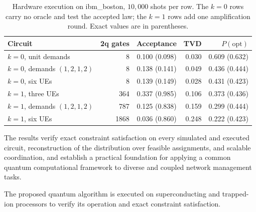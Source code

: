 \begin{table}[!t]
\centering
\caption{Hardware execution on ibm\_boston, $10{,}000$ shots per row. The
$k=0$ rows carry no oracle and test the accepted law; the $k=1$ rows add one
amplification round. Exact values are in parentheses.}
\label{tab:eval_hardware}
\footnotesize
\setlength{\tabcolsep}{3pt}
\begin{tabular}{lrrrr}
\toprule
Circuit & 2q gates & Acceptance & TVD & $P(\text{opt})$ \\
\midrule
$k=0$, unit demands        &    8 & 0.100 (0.098) & 0.030 & 0.609 (0.632) \\
$k=0$, demands $(1,2,1,2)$ &    8 & 0.138 (0.141) & 0.049 & 0.436 (0.444) \\
$k=0$, six UEs             &    8 & 0.139 (0.149) & 0.028 & 0.431 (0.423) \\
$k=1$, three UEs           &  364 & 0.337 (0.985) & 0.106 & 0.373 (0.436) \\
$k=1$, demands $(1,2,1,2)$ &  787 & 0.125 (0.838) & 0.159 & 0.299 (0.444) \\
$k=1$, six UEs             & 1868 & 0.036 (0.860) & 0.248 & 0.222 (0.423) \\
\bottomrule
\end{tabular}
\end{table}


The results verify exact constraint satisfaction on every simulated and
executed circuit, reconstruction of the distribution over feasible
assignments, and scalable coordination, and establish a practical foundation
for applying a common quantum computational framework to diverse and coupled
network management tasks.


The proposed quantum algorithm is executed on superconducting and trapped-ion
processors to verify its operation and exact constraint satisfaction.
